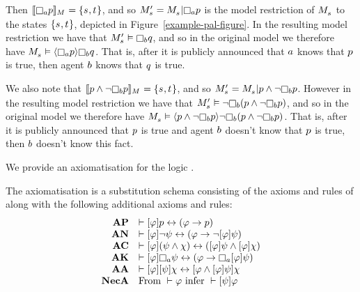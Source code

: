\begin{example}
Then $\interpretation[\kModel]{\knowsA \atomP} = \{\kStateS, \kStateT\}$, and so $\kPModelP{\kStateS} = \restrict{\kPModel{\kStateS}}{\knowsA \atomP}$ is the model restriction of $\kPModel{\kStateS}$ to the states $\{\kStateS, \kStateT\}$, depicted in Figure~\ref{example-pal-figure}.  
In the resulting model restriction we have that $\kPModelP{\kStateS} \entails \knowsB \atomQ$, and so in the original model we therefore have $\kPModel{\kStateS} \entails \announceE{\knowsA \atomP} \knowsB \atomQ$.
That is, after it is publicly announced that $a$ knows that $p$ is true, then agent $b$ knows that $q$ is true.

We also note that $\interpretation[\kModel]{\atomP \land \lnot \knowsB \atomP} = \{\kStateS, \kStateT\}$, and so $\kPModelP{\kStateS} = \restrict{\kPModel{\kStateS}}{\atomP \land \lnot \knowsB \atomP}$.
However in the resulting model restriction we have that $\kPModelP{\kStateS} \entails \lnot \knowsB (\atomP \land \lnot \knowsB \atomP)$, and so in the original model we therefore have $\kPModel{\kStateS} \entails \announceE{\atomP \land \lnot \knowsB \atomP} \lnot \knowsB (\atomP \land \lnot \knowsB \atomP)$.
That is, after it is publicly announced that $p$ is true and agent $b$ doesn't know that $p$ is true, then $b$ doesn't know this fact.
\end{example}

We provide an axiomatisation for the logic \logicPalS{}.

\begin{definition}
The axiomatisation \axiomPalS{} is a substitution schema consisting of the axioms and rules of \axiomS{} along with the following additional axioms and rules:
$$
\begin{array}{rl}
    {\bf AP} & \proves \announceA{\phi} \atomP \iff (\phi \implies \atomP)\\
    {\bf AN} & \proves \announceA{\phi} \lnot \psi \iff (\phi \implies \lnot \announceA{\phi} \psi)\\
    {\bf AC} & \proves \announceA{\phi} (\psi \land \chi) \iff (\announceA{\phi} \psi \land \announceA{\phi} \chi)\\
    {\bf AK} & \proves \announceA{\phi} \necessaryA \psi \iff (\phi \implies \necessaryA \announceA{\phi} \psi)\\
    {\bf AA} & \proves \announceA{\phi} \announceA{\psi} \chi \iff \announceA{\phi \land \announceA{\phi} \psi} \chi\\
    {\bf NecA} & \text{From } \proves \phi \text{ infer } \proves \announceA{\psi} \phi
\end{array}
$$
\end{definition}

